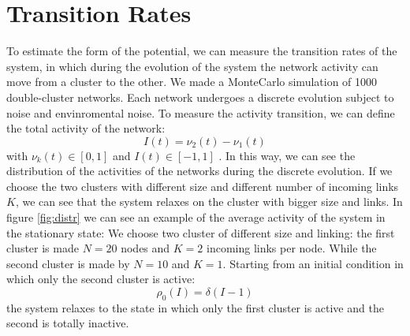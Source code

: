\section{Transition Rates}
To estimate the form of the potential, we can measure the transition rates of the system, in which during the evolution of the system the network activity can move from a cluster to the other.
We made a MonteCarlo simulation of 1000 double-cluster networks. Each network undergoes a discrete evolution subject to noise and envinromental noise.
To measure the activity transition, we can define the total activity of the network:
\begin{equation}
I(t) = \nu_2(t) - \nu_1(t)
\end{equation}
with $\nu_k(t) \in [0,1]$ and $I(t) \in [-1,1]$ .
In this way, we can see the distribution of the activities of the networks during the discrete evolution.
If we choose the two clusters with different size and different number of incoming links $K$, we can see that the system relaxes on the cluster with bigger size and links.
In figure \ref{fig:distr} we can see an example of the average activity of the system in the stationary state: We choose two cluster of different size and linking: the first cluster is made $N=20$ nodes and $K=2$ incoming links per node. While the second cluster is made by $N=10$ and $K=1$. Starting from an initial condition in which only the second  cluster is active:
$$
\rho_0(I) = \delta(I-1)
$$
the system relaxes to the state in which only the first cluster is active and the second is totally inactive.


